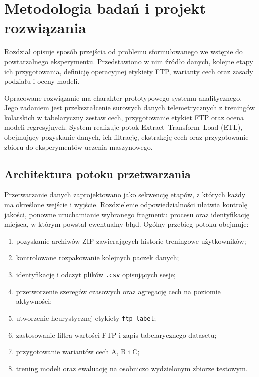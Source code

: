 \chapter{Metodologia badań i projekt rozwiązania}

Rozdział opisuje sposób przejścia od problemu sformułowanego we wstępie do powtarzalnego eksperymentu. Przedstawiono w nim źródło danych, kolejne etapy ich przygotowania, definicję operacyjnej etykiety FTP, warianty cech oraz zasady podziału i oceny modeli.

Opracowane rozwiązanie ma charakter prototypowego systemu analitycznego. Jego zadaniem jest przekształcenie surowych danych telemetrycznych z treningów kolarskich w tabelaryczny zestaw cech, przygotowanie etykiet FTP oraz ocena modeli regresyjnych. System realizuje potok Extract--Transform--Load (ETL), obejmujący pozyskanie danych, ich filtrację, ekstrakcję cech oraz przygotowanie zbioru do eksperymentów uczenia maszynowego.

\section{Architektura potoku przetwarzania}

Przetwarzanie danych zaprojektowano jako sekwencję etapów, z których każdy ma określone wejście i wyjście. Rozdzielenie odpowiedzialności ułatwia kontrolę jakości, ponowne uruchamianie wybranego fragmentu procesu oraz identyfikację miejsca, w którym powstał ewentualny błąd. Ogólny przebieg potoku obejmuje:
\begin{enumerate}
    \item pozyskanie archiwów ZIP zawierających historie treningowe użytkowników;
    \item kontrolowane rozpakowanie kolejnych paczek danych;
    \item identyfikację i odczyt plików \texttt{.csv} opisujących sesje;
    \item przetworzenie szeregów czasowych oraz agregację cech na poziomie aktywności;
    \item utworzenie heurystycznej etykiety \texttt{ftp\_label};
    \item zastosowanie filtra wartości FTP i zapis tabelarycznego datasetu;
    \item przygotowanie wariantów cech A, B i C;
    \item trening modeli oraz ewaluację na osobniczo wydzielonym zbiorze testowym.
\end{enumerate}

